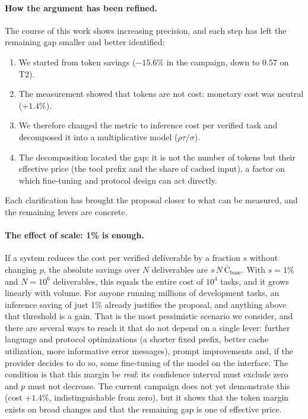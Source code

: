\documentclass[11pt, a4paper]{article}
\newcommand{\pc}{\%}
\newcommand{\cost}{\mathrm{C}}
\begin{document}
\paragraph{How the argument has been refined.} The course of this work shows increasing precision, and each step has left the remaining gap smaller and better identified:
\begin{enumerate}[nosep]
  \item We started from token savings ($-15.6\pc$ in the campaign, down to $0.57$ on T2).
  \item The measurement showed that tokens are not cost: monetary cost was neutral ($+1.4\pc$).
  \item We therefore changed the metric to inference cost per verified task and decomposed it into a multiplicative model ($\rho\tau/\sigma$).
  \item The decomposition located the gap: it is not the number of tokens but their effective price (the tool prefix and the share of cached input), a factor on which fine-tuning and protocol design can act directly.
\end{enumerate}
Each clarification has brought the proposal closer to what can be measured, and the remaining levers are concrete.

\paragraph{The effect of scale: 1\pc{} is enough.} If a system reduces the cost per verified deliverable by a fraction $s$ without changing $p$, the absolute savings over $N$ deliverables are $s\,N\,\bar{\cost}_{\mathrm{base}}$. With $s=1\pc$ and $N=10^{6}$ deliverables, this equals the entire cost of $10^{4}$ tasks, and it grows linearly with volume. For anyone running millions of development tasks, an inference saving of just 1\pc{} already justifies the proposal, and anything above that threshold is a gain. That is the most pessimistic scenario we consider, and there are several ways to reach it that do not depend on a single lever: further language and protocol optimizations (a shorter fixed prefix, better cache utilization, more informative error messages), prompt improvements and, if the provider decides to do so, some fine-tuning of the model on the interface. The condition is that this margin be \emph{real}: its confidence interval must exclude zero and $p$ must not decrease. The current campaign does not yet demonstrate this (cost $+1.4\pc$, indistinguishable from zero), but it shows that the token margin exists on broad changes and that the remaining gap is one of effective price.
\end{document}
